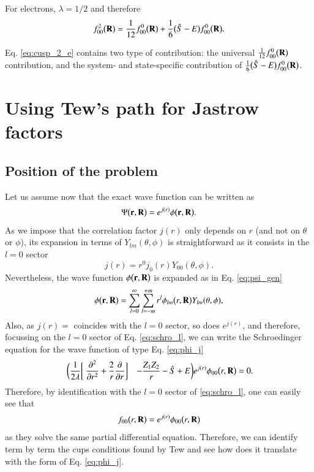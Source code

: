 \documentclass[aip,jcp,reprint,noshowkeys,superscriptaddress]{revtex4-1}
\newcommand{\deriv}[3]{\frac{\partial^{#3} #1}{\partial {#2}^{#3}}}
\newcommand{\bd}[1]{{\bf {#1}}}
\newcommand{\br}[0]{{\bf {r}}}
\begin{document}
For electrons, $\lambda=1/2$ and therefore
\begin{equation}
 \label{eq:cusp_2_e}
f_{00}^2\big(\bd{R}\big) = \frac{1}{12} f_{00}^0\big(\bd{R}\big) + 
 \frac{1}{6} \big( \hat{S} -E \big) f_{00}^0\big(\bd{R}\big). 
\end{equation}

Eq. \eqref{eq:cusp_2_e} contains two type of contribution: the universal $\frac{1}{12} f_{00}^0\big(\bd{R}\big)$ contribution, and the system- and state-specific contribution of $\frac{1}{6} \big( \hat{S} -E \big) f_{00}^0\big(\bd{R}\big)$. 

\section{Using Tew's path for Jastrow factors}
\subsection{Position of the problem}
Let us assume now that the exact wave function can be written as 
\begin{equation}
 \label{eq:phi_j}
 \Psi\big(\br,\bd{R}\big) = e^{j(r)}\phi\big(\br,\bd{R}\big).
\end{equation}
As we impose that the correlation factor $j(r)$ only depends on $r$ (and not on $\theta$ or $\phi$), its expansion in terms of $Y_{lm}(\theta,\phi)$ is straightforward as it consists in the $l=0$ sector
\begin{equation}
 j(r) = r^0 j_{0}(r)Y_{00}(\theta,\phi).
\end{equation}
Nevertheless, the wave function $\phi\big(\br,\bd{R}\big)$ is expanded as in Eq. \eqref{eq:psi_gen}
\begin{equation} 
 \phi\big(\br,\bd{R}\big) = \sum_{l=0}^{\infty} \sum_{l=-m}^{+m} 
 r^l \phi_{lm}\big(r,\bd{R}\big) Y_{lm}(\theta,\phi), 
\end{equation}
Also, as $j(r) =$ coincides with the $l=0$ sector, so does $e^{j(r)}$, and therefore, focussing on the $l=0$ sector of Eq. \eqref{eq:schro_l},  we can write the Schroedinger equation for the wave function of type Eq. \eqref{eq:phi_j} 
\begin{equation}
 \label{eq:schro_phi_j}
 \begin{aligned}
& \bigg( \frac{1}{2\lambda} \bigg[ \deriv{}{r}{2} + \frac{2}{r} \deriv{}{r}{}\bigg] 
&- \frac{Z_1 Z_2}{r}  - \hat{S} + E \bigg) e^{j(r)}\phi_{00}\big(r,\bd{R}\big) =0.
 \end{aligned}
\end{equation}
Therefore, by identification with the $l=0$ sector of \eqref{eq:schro_l}, one can easily see that
\begin{equation}
 f_{00}\big(r,\bd{R}\big) = e^{j(r)}\phi_{00}\big(r,\bd{R}\big)
\end{equation}
as they solve the same partial differential equation. 
Therefore, we can identify term by term the cups conditions found by Tew and see how does it translate with the form of Eq. \eqref{eq:phi_j}. 
\end{document}
